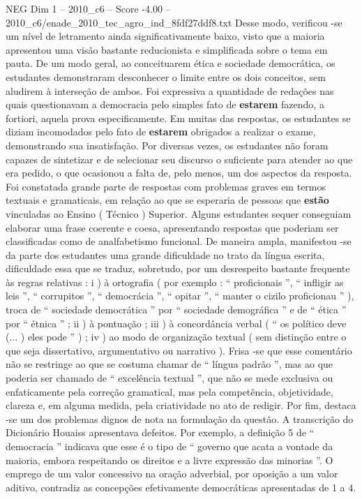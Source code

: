 \begin{textsample}{NEG Dim 1 – 2010\_c6 – Score -4.00 – 2010\_c6/enade\_2010\_tec\_agro\_ind\_8fdf27ddf8.txt}
Desse modo, verificou -se um nível de letramento ainda significativamente baixo, visto que a maioria apresentou uma visão bastante reducionista e simplificada sobre o tema em pauta.
De um modo geral, ao conceituarem ética e sociedade democrática, os estudantes demonstraram desconhecer o limite entre os dois conceitos, sem aludirem à interseção de ambos.
Foi expressiva a quantidade de redações nas quais questionavam a democracia pelo simples fato de \textbf{estarem} fazendo, a fortiori, aquela prova especificamente.
Em muitas das respostas, os estudantes se diziam incomodados pelo fato de \textbf{estarem} obrigados a realizar o exame, demonstrando sua insatisfação.
Por diversas vezes, os estudantes não foram capazes de sintetizar e de selecionar seu discurso o suficiente para atender ao que era pedido, o que ocasionou a falta de, pelo menos, um dos aspectos da resposta.
Foi constatada grande parte de respostas com problemas graves em termos textuais e gramaticais, em relação ao que se esperaria de pessoas que \textbf{estão} vinculadas ao Ensino ( Técnico ) Superior.
Alguns estudantes sequer conseguiam elaborar uma frase coerente e coesa, apresentando respostas que poderiam ser classificadas como de analfabetismo funcional.
De maneira ampla, manifestou -se da parte dos estudantes uma grande dificuldade no trato da língua escrita, dificuldade essa que se traduz, sobretudo, por um desrespeito bastante frequente às regras relativas : i ) à ortografia ( por exemplo : “ proficionais ”, “ infligir as leis ”, “ corrupitos ”, “ democrácia ”, “ opitar ”, “ manter o cizilo proficionau ” ), troca de “ sociedade democrática ” por “ sociedade demográfica ” e de “ ética ” por “ étnica ” ; ii ) à pontuação ; iii ) à concordância verbal ( “ os político deve (... ) eles pode ” ) ; iv ) ao modo de organização textual ( sem distinção entre o que seja dissertativo, argumentativo ou narrativo ).
Frisa -se que esse comentário não se restringe ao que se costuma chamar de “ língua padrão ”, mas ao que poderia ser chamado de “ excelência textual ”, que não se mede exclusiva ou enfaticamente pela correção gramatical, mas pela competência, objetividade, clareza e, em alguma medida, pela criatividade no ato de redigir.
Por fim, destaca -se um dos problemas dignos de nota na formulação da questão.
A transcrição do Dicionário Houaiss apresentava defeitos.
Por exemplo, a definição 5 de “ democracia ” indicava que esse é o tipo de “ governo que acata a vontade da maioria, embora respeitando os direitos e a livre expressão das minorias ”.
O emprego de um valor concessivo na oração adverbial, por oposição a um valor aditivo, contradiz as concepções efetivamente democráticas apresentadas de 1 a 4.

\end{textsample}
